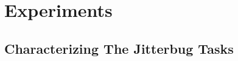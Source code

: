 \documentclass[letterpaper, 10 pt, conference]{ieeeconf}
\begin{document}
\section{Experiments}

\subsection{Characterizing The Jitterbug Tasks}



\end{document}
